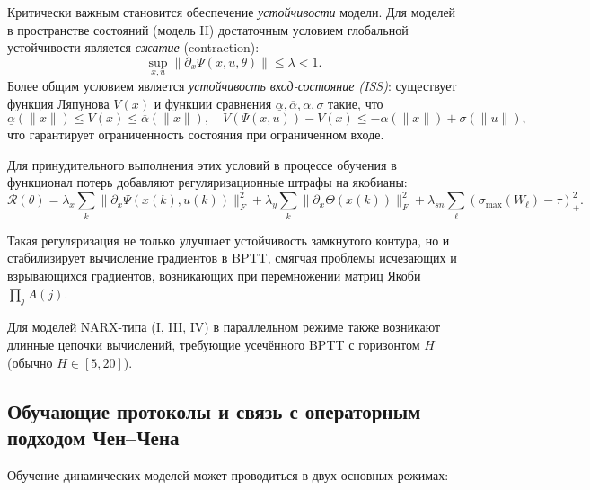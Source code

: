 \documentclass[../NDCNNAI_main.tex]{subfiles}
\begin{document}
Критически важным становится обеспечение \emph{устойчивости} модели. Для моделей в пространстве состояний (модель II) достаточным условием глобальной устойчивости является \emph{сжатие} (contraction):
\[
\sup_{x, u} \| \partial_x \Psi(x, u, \theta) \| \leq \lambda < 1.
\]
Более общим условием является \emph{устойчивость вход-состояние (ISS)}: существует функция Ляпунова \(V(x)\) и функции сравнения \(\underline{\alpha}, \overline{\alpha}, \alpha, \sigma\) такие, что
\[
\underline{\alpha}(\|x\|) \leq V(x) \leq \overline{\alpha}(\|x\|), \quad V(\Psi(x, u)) - V(x) \leq -\alpha(\|x\|) + \sigma(\|u\|),
\]
что гарантирует ограниченность состояния при ограниченном входе.

Для принудительного выполнения этих условий в процессе обучения в функционал потерь добавляют регуляризационные штрафы на якобианы:
\[
\mathcal{R}(\theta) = \lambda_x \sum_k \|\partial_x \Psi(x(k), u(k))\|_F^2 + \lambda_y \sum_k \|\partial_x \Theta(x(k))\|_F^2 + \lambda_{sn} \sum_\ell (\sigma_{\max}(W_\ell) - \tau)_+^2.
\]

Такая регуляризация не только улучшает устойчивость замкнутого контура, но и стабилизирует вычисление градиентов в BPTT, смягчая проблемы исчезающих и взрывающихся градиентов, возникающих при перемножении матриц Якоби \(\prod_j A(j)\).

Для моделей NARX-типа (I, III, IV) в параллельном режиме также возникают длинные цепочки вычислений, требующие усечённого BPTT с горизонтом \(H\) (обычно \(H \in [5, 20]\)).

\subsection{Обучающие протоколы и связь с операторным подходом Чен--Чена}

Обучение динамических моделей может проводиться в двух основных режимах:
\end{document}
